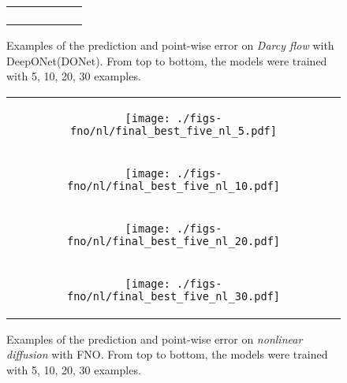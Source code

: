 {\begin{figure}
\begin{tabular}[c]{c}
\begin{subfigure}[b]{0.48\textwidth}
	\end{subfigure}
\end{tabular}
	\caption{\small Examples of the prediction and point-wise error on \textit{Darcy flow} with DeepONet(DONet). From top to bottom, the models were trained with 5, 10, 20, 30 examples.}
 \label{fig:darcy-dont-example}
\end{figure}
\begin{figure}
	\centering
	\setlength\tabcolsep{0pt}
	\begin{tabular}[c]{c}
	\begin{subfigure}[b]{0.48\textwidth}
		\centering
		\texttt{[image: ./figs-fno/nl/final\_best\_five\_nl\_5.pdf]}
	\end{subfigure} \\
	\begin{subfigure}[b]{0.48\textwidth}
		\centering
		\texttt{[image: ./figs-fno/nl/final\_best\_five\_nl\_10.pdf]}
	\end{subfigure}\\
 \begin{subfigure}[b]{0.48\textwidth}
		\centering
		\texttt{[image: ./figs-fno/nl/final\_best\_five\_nl\_20.pdf]}
	\end{subfigure}\\
 \begin{subfigure}[b]{0.48\textwidth}
		\centering
		\texttt{[image: ./figs-fno/nl/final\_best\_five\_nl\_30.pdf]}
	\end{subfigure}
\end{tabular}
	\caption{\small Examples of the prediction and point-wise error on \textit{nonlinear diffusion} with FNO. From top to bottom, the models were trained with 5, 10, 20, 30 examples.}
 \label{fig:nl-fno-example}
\end{figure}
}

